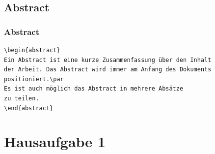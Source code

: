 \subsection{Abstract}

\begin{frame}[fragile]
\frametitle{Abstract}

{\small
\begin{lstlisting}
\begin{abstract}
Ein Abstract ist eine kurze Zusammenfassung über den Inhalt 
der Arbeit. Das Abstract wird immer am Anfang des Dokuments 
positioniert.\par 
Es ist auch möglich das Abstract in mehrere Absätze
zu teilen.
\end{abstract}
\end{lstlisting}
}

\end{frame}


\section{Hausaufgabe 1}

